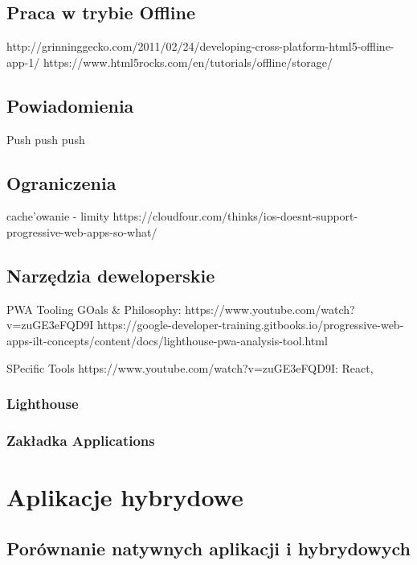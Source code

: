 \documentclass[a4paper,12pt,twoside,openany]{report}
\begin{document}
\section{Praca w trybie Offline}
http://grinninggecko.com/2011/02/24/developing-cross-platform-html5-offline-app-1/
https://www.html5rocks.com/en/tutorials/offline/storage/

\section{Powiadomienia}
Push push push
\section{Ograniczenia}
cache'owanie - limity
https://cloudfour.com/thinks/ios-doesnt-support-progressive-web-apps-so-what/
\section{Narzędzia deweloperskie}



PWA Tooling GOals & Philosophy:
https://www.youtube.com/watch?v=zuGE3eFQD9I
https://google-developer-training.gitbooks.io/progressive-web-apps-ilt-concepts/content/docs/lighthouse-pwa-analysis-tool.html

SPecific Tools
https://www.youtube.com/watch?v=zuGE3eFQD9I: 
React, 
\subsection*{Lighthouse}
\subsection*{Zakładka Applications}

\chapter{Aplikacje hybrydowe} \label{chap:hybrid}
\section{Porównanie natywnych aplikacji i hybrydowych}
\end{document}
